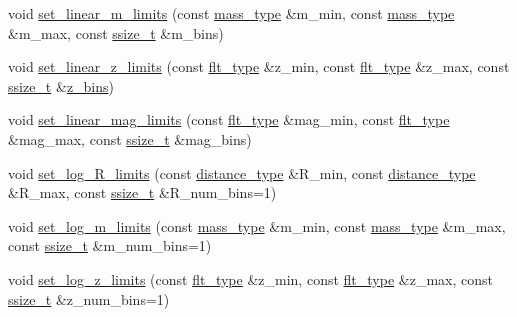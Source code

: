 \begin{DoxyCompactItemize}
\item 
void \hyperlink{classIceBRG_1_1pair__bins__summary_a7b2524d7dfe25fbcdc378cbc36573946}{set\-\_\-linear\-\_\-m\-\_\-limits} (const \hyperlink{namespaceIceBRG_a1be72ac4918a9b029f2eefa084213e35}{mass\-\_\-type} \&m\-\_\-min, const \hyperlink{namespaceIceBRG_a1be72ac4918a9b029f2eefa084213e35}{mass\-\_\-type} \&m\-\_\-max, const \hyperlink{lib_2IceBRG__main_2common_8h_ab322a3e50421dc5f0c43316b1b373592}{ssize\-\_\-t} \&m\-\_\-bins)
\item 
void \hyperlink{classIceBRG_1_1pair__bins__summary_a42909af4d308561fc055ea4c6766a752}{set\-\_\-linear\-\_\-z\-\_\-limits} (const \hyperlink{lib_2IceBRG__main_2common_8h_ad0f130a56eeb944d9ef2692ee881ecc4}{flt\-\_\-type} \&z\-\_\-min, const \hyperlink{lib_2IceBRG__main_2common_8h_ad0f130a56eeb944d9ef2692ee881ecc4}{flt\-\_\-type} \&z\-\_\-max, const \hyperlink{lib_2IceBRG__main_2common_8h_ab322a3e50421dc5f0c43316b1b373592}{ssize\-\_\-t} \&\hyperlink{main__field__stats_8cpp_a6d4d8cfc3c2eccfe9ed5091d304e8dcd}{z\-\_\-bins})
\item 
void \hyperlink{classIceBRG_1_1pair__bins__summary_a0dfc0341ace9bdf0d98b301bafbeebed}{set\-\_\-linear\-\_\-mag\-\_\-limits} (const \hyperlink{lib_2IceBRG__main_2common_8h_ad0f130a56eeb944d9ef2692ee881ecc4}{flt\-\_\-type} \&mag\-\_\-min, const \hyperlink{lib_2IceBRG__main_2common_8h_ad0f130a56eeb944d9ef2692ee881ecc4}{flt\-\_\-type} \&mag\-\_\-max, const \hyperlink{lib_2IceBRG__main_2common_8h_ab322a3e50421dc5f0c43316b1b373592}{ssize\-\_\-t} \&mag\-\_\-bins)
\item 
void \hyperlink{classIceBRG_1_1pair__bins__summary_a25e1c227f1d508602345aaf5c3bf2f6f}{set\-\_\-log\-\_\-\-R\-\_\-limits} (const \hyperlink{namespaceIceBRG_a45499647eb87e24c10ab32c628711cec}{distance\-\_\-type} \&R\-\_\-min, const \hyperlink{namespaceIceBRG_a45499647eb87e24c10ab32c628711cec}{distance\-\_\-type} \&R\-\_\-max, const \hyperlink{lib_2IceBRG__main_2common_8h_ab322a3e50421dc5f0c43316b1b373592}{ssize\-\_\-t} \&R\-\_\-num\-\_\-bins=1)
\item 
void \hyperlink{classIceBRG_1_1pair__bins__summary_aae072aa17b4d036a2b75adadd051e7b7}{set\-\_\-log\-\_\-m\-\_\-limits} (const \hyperlink{namespaceIceBRG_a1be72ac4918a9b029f2eefa084213e35}{mass\-\_\-type} \&m\-\_\-min, const \hyperlink{namespaceIceBRG_a1be72ac4918a9b029f2eefa084213e35}{mass\-\_\-type} \&m\-\_\-max, const \hyperlink{lib_2IceBRG__main_2common_8h_ab322a3e50421dc5f0c43316b1b373592}{ssize\-\_\-t} \&m\-\_\-num\-\_\-bins=1)
\item 
void \hyperlink{classIceBRG_1_1pair__bins__summary_aa4cc8227dd39e7694b0c7ed8f628a239}{set\-\_\-log\-\_\-z\-\_\-limits} (const \hyperlink{lib_2IceBRG__main_2common_8h_ad0f130a56eeb944d9ef2692ee881ecc4}{flt\-\_\-type} \&z\-\_\-min, const \hyperlink{lib_2IceBRG__main_2common_8h_ad0f130a56eeb944d9ef2692ee881ecc4}{flt\-\_\-type} \&z\-\_\-max, const \hyperlink{lib_2IceBRG__main_2common_8h_ab322a3e50421dc5f0c43316b1b373592}{ssize\-\_\-t} \&z\-\_\-num\-\_\-bins=1)

\end{DoxyCompactItemize}
